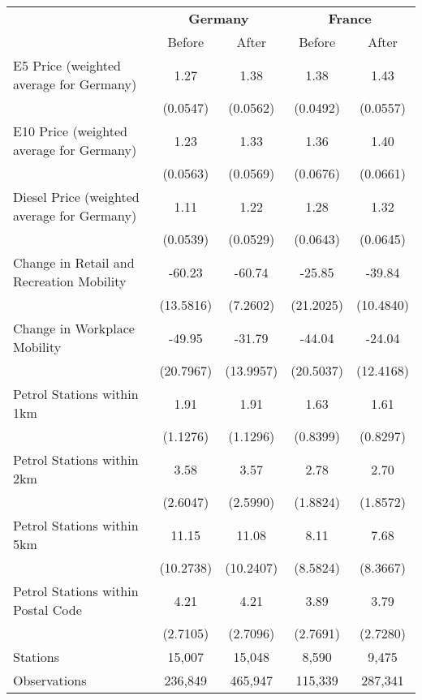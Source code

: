 \begin{tabular}{l*{4}{c}}
\toprule
                    &\multicolumn{2}{c}{\textbf{Germany}}&\multicolumn{2}{c}{\textbf{France}}\\\cmidrule(lr){2-3}\cmidrule(lr){4-5}
                    &\multicolumn{1}{c}{Before}&\multicolumn{1}{c}{After}&\multicolumn{1}{c}{Before}&\multicolumn{1}{c}{After}\\
\midrule
E5 Price (weighted average for Germany)&        1.27&        1.38&        1.38&        1.43\\
                    &    (0.0547)&    (0.0562)&    (0.0492)&    (0.0557)\\
E10 Price (weighted average for Germany)&        1.23&        1.33&        1.36&        1.40\\
                    &    (0.0563)&    (0.0569)&    (0.0676)&    (0.0661)\\
Diesel Price (weighted average for Germany)&        1.11&        1.22&        1.28&        1.32\\
                    &    (0.0539)&    (0.0529)&    (0.0643)&    (0.0645)\\
Change in Retail and Recreation Mobility&      -60.23&      -60.74&      -25.85&      -39.84\\
                    &   (13.5816)&    (7.2602)&   (21.2025)&   (10.4840)\\
Change in Workplace Mobility&      -49.95&      -31.79&      -44.04&      -24.04\\
                    &   (20.7967)&   (13.9957)&   (20.5037)&   (12.4168)\\
Petrol Stations within 1km&        1.91&        1.91&        1.63&        1.61\\
                    &    (1.1276)&    (1.1296)&    (0.8399)&    (0.8297)\\
Petrol Stations within 2km&        3.58&        3.57&        2.78&        2.70\\
                    &    (2.6047)&    (2.5990)&    (1.8824)&    (1.8572)\\
Petrol Stations within 5km&       11.15&       11.08&        8.11&        7.68\\
                    &   (10.2738)&   (10.2407)&    (8.5824)&    (8.3667)\\
Petrol Stations within Postal Code&        4.21&        4.21&        3.89&        3.79\\
                    &    (2.7105)&    (2.7096)&    (2.7691)&    (2.7280)\\
\midrule
Stations            &      15,007&      15,048&       8,590&       9,475\\
Observations        &     236,849&     465,947&     115,339&     287,341\\
\bottomrule
\end{tabular}
